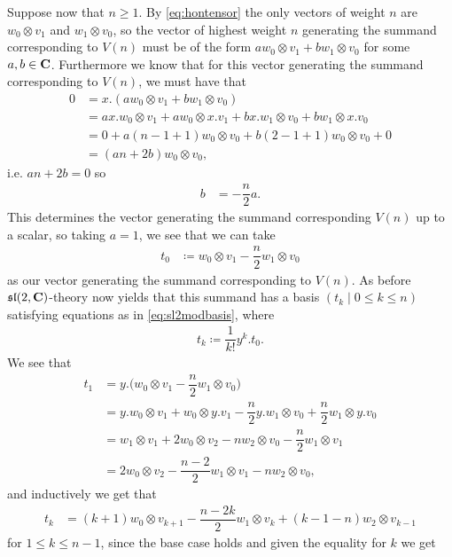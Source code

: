Suppose now that $n\geq 1$. By \cref{eq:hontensor} the only vectors of weight $n$ are $w_0\otimes v_1$ and $w_1\otimes v_0$, so the vector of highest weight $n$ generating the summand corresponding to $V(n)$ must be of the form $aw_0\otimes v_1 + bw_1\otimes v_0$ for some $a,b\in \mathbf{C}$. Furthermore we know that for this vector generating the summand corresponding to $V(n)$, we must have that
\begin{align*}
  0 &= x.(aw_0\otimes v_1 + bw_1\otimes v_0) \\
    &= ax.w_0 \otimes v_1 + aw_0\otimes x.v_1 + bx.w_1\otimes v_0 + bw_1\otimes x.v_0 \\
    &= 0 + a(n-1+1)w_0\otimes v_0 + b(2-1+1)w_0\otimes v_0 + 0 \\
  &= (an+2b)w_0\otimes v_0, 
\end{align*}
i.e. $an+2b=0$ so
\begin{align*}
  b &= -\dfrac{n}{2}a.
\end{align*}
This determines the vector generating the summand corresponding $V(n)$ up to a scalar, so taking $a=1$, we see that we can take
\begin{align*}
  t_0 &\coloneqq w_0\otimes v_1 - \dfrac{n}{2}w_1\otimes v_0
\end{align*}
as our vector generating the summand corresponding to $V(n)$. As before $\mathfrak{sl}(2,\mathbf{C})$-theory now yields that this summand has a basis $(t_k \mid 0\leq k\leq n)$ satisfying equations as in \cref{eq:sl2modbasis}, where
\begin{align*}
  t_k \coloneqq \dfrac{1}{k!}y^k.t_0.
\end{align*}
We see that
\begin{align*}
  t_1 &= y.\bigl(w_0\otimes v_1 - \dfrac{n}{2}w_1\otimes v_0\bigr) \\
      &= y.w_0\otimes v_1 + w_0\otimes y.v_1 - \dfrac{n}{2}y.w_1\otimes v_0 + \dfrac{n}{2}w_1\otimes y.v_0 \\
      &= w_1\otimes v_1 + 2w_0\otimes v_2 - nw_2\otimes v_0 - \dfrac{n}{2}w_1\otimes v_1 \\
  &= 2w_0\otimes v_2 -\dfrac{n-2}{2}w_1\otimes v_1 - nw_2\otimes v_0,
\end{align*}
and inductively we get that
\begin{align*}
  t_k &= (k+1)w_0\otimes v_{k+1} - \dfrac{n-2k}{2}w_1\otimes v_k + (k-1-n)w_2\otimes v_{k-1}
\end{align*}
for $1\leq k\leq n-1$, since the base case holds and given the equality for $k$ we get
